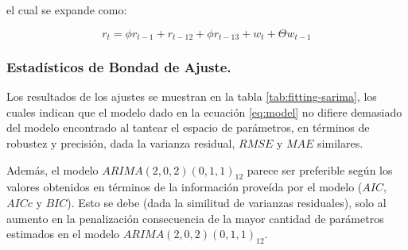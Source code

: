 \documentclass[]{article}
\newenvironment{Shaded}{\begin{snugshade}}{\end{snugshade}}
\newcommand{\CharTok}[1]{\textcolor[rgb]{0.31,0.60,0.02}{#1}}
\newcommand{\DataTypeTok}[1]{\textcolor[rgb]{0.13,0.29,0.53}{#1}}
\newcommand{\DecValTok}[1]{\textcolor[rgb]{0.00,0.00,0.81}{#1}}
\newcommand{\KeywordTok}[1]{\textcolor[rgb]{0.13,0.29,0.53}{\textbf{#1}}}
\newcommand{\NormalTok}[1]{#1}
\newcommand{\OperatorTok}[1]{\textcolor[rgb]{0.81,0.36,0.00}{\textbf{#1}}}
\newcommand{\OtherTok}[1]{\textcolor[rgb]{0.56,0.35,0.01}{#1}}
\newcommand{\StringTok}[1]{\textcolor[rgb]{0.31,0.60,0.02}{#1}}
\begin{document}
el cual se expande como:

\[
r_t = \phi r_{t-1} + r_{t-12} + \phi r_{t-13} + w_t + \Theta w_{t-1}\label{eq:model}
\]

\hypertarget{estaduxedsticos-de-bondad-de-ajuste.}{%
\subsubsection{Estadísticos de Bondad de Ajuste.}\label{estaduxedsticos-de-bondad-de-ajuste.}}

Los resultados de los ajustes se muestran en la tabla \ref{tab:fitting-sarima}, los cuales indican que el modelo dado en la ecuación \ref{eq:model} no difiere demasiado del modelo encontrado al tantear el espacio de parámetros, en términos de robustez y precisión, dada la varianza residual, \(RMSE\) y \(MAE\) similares.

Además, el modelo \(ARIMA(2, 0, 2)(0, 1, 1)_{12}\) parece ser preferible según los valores obtenidos en términos de la información proveída por el modelo (\(AIC\), \(AICc\) y \(BIC\)). Esto se debe (dada la similitud de varianzas residuales), solo al aumento en la penalización consecuencia de la mayor cantidad de parámetros estimados en el modelo \(ARIMA(2, 0, 2)(0, 1, 1)_{12}\).

\begin{Shaded}
\end{Shaded}
\end{document}

